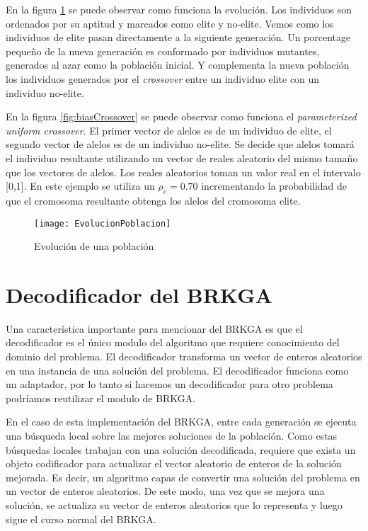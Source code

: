 \bigskip

En la figura \ref{fig:evolucion} se puede observar como funciona la evolución. Los individuos son ordenados por su aptitud y marcados como elite y no-elite. Vemos como los individuos de elite pasan directamente a la siguiente generación. Un porcentage pequeño de la nueva generación es conformado por individuos mutantes, generados al azar como la población inicial. Y complementa la nueva población los individuos generados por el \textit{crossover} entre un individuo elite con un individuo no-elite. 

\bigskip

En la figura \ref{fig:biasCrossover} se puede observar como funciona el \textit{parameterized uniform crossover}. El primer vector de alelos es de un individuo de elite, el segundo vector de alelos es de un individuo no-elite. Se decide que alelos tomará el individuo resultante utilizando un vector de reales aleatorio del mismo tamaño que los vectores de alelos. Los reales aleatorios toman un valor real en el intervalo [0,1]. En este ejemplo se utiliza un $\rho_e = 0.70$ incrementando la probabilidad de que el cromosoma resultante obtenga los alelos del cromosoma elite.

\begin{figure}[h]
	\caption{Evolución de una población}
	\centering
	\texttt{[image: EvolucionPoblacion]}
	\label{fig:evolucion}
\end{figure}

\section{Decodificador del BRKGA}

Una característica importante para mencionar del BRKGA es que el decodificador es el único modulo del algoritmo que requiere conocimiento del dominio del problema. El decodificador transforma un vector de enteros aleatorios en una instancia de una solución del problema. El decodificador funciona como un adaptador, por lo tanto si hacemos un decodificador para otro problema podríamos reutilizar el modulo de BRKGA.

\bigskip

En el caso de esta implementación del BRKGA, entre cada generación se ejecuta una búsqueda local sobre las mejores soluciones de la población. Como estas búsquedas locales trabajan con una solución decodificada, requiere que exista un objeto codificador para actualizar el vector aleatorio de enteros de la solución mejorada. Es decir, un algoritmo capas de convertir una solución del problema en un vector de enteros aleatorios. De este modo, una vez que se mejora una solución, se actualiza su vector de enteros aleatorios que lo representa y luego sigue el curso normal del BRKGA. 

